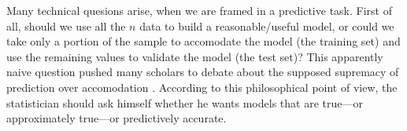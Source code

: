 \documentclass{statsoc}
\begin{document}
%
%
%
Many technical quesions arise, when we are framed in a predictive task. First of all, should we use all the $n$ data to build a reasonable/useful model, or could we take only a portion of the 
sample to accomodate the model (the training set) and use the remaining values to validate the model (the test set)? This apparently naive question pushed many scholars to debate 
about the supposed supremacy of prediction over accomodation \citep{maher1988prediction, hitchcock2004prediction, worrall2014prediction}. According to this philosophical point of view, the 
statistician should ask himself whether he wants models that are true---or  approximately true---or predictively accurate. 
\end{document}
